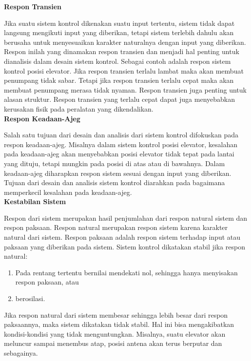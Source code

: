\noindent \textbf{Respon Transien}

Jika suatu sistem kontrol dikenakan suatu input tertentu, sistem tidak dapat langsung mengikuti input yang diberikan, tetapi sistem terlebih dahulu akan berusaha untuk menyesuaikan karakter naturalnya dengan input yang diberikan. Respon inilah yang dinamakan respon transien dan menjadi hal penting untuk dianalisis dalam desain sistem kontrol. Sebagai contoh adalah respon sistem kontrol posisi elevator. Jika respon transien terlalu lambat maka akan membuat penumpang tidak sabar. Tetapi jika respon transien terlalu cepat maka akan membuat penumpang merasa tidak nyaman. Respon transien juga penting untuk alasan struktur. Respon transien yang terlalu cepat dapat juga menyebabkan kerusakan fisik pada peralatan yang dikendalikan.\cite{ControlSystemBook} \\

\noindent \textbf{Respon Keadaan-Ajeg}

Salah satu tujuan dari desain dan analisis dari sistem kontrol difokuskan pada respon keadaan-ajeg. Misalnya dalam sistem kontrol posisi elevator, kesalahan pada keadaan-ajeg akan menyebabkan posisi elevator tidak tepat pada lantai yang dituju, tetapi mungkin pada posisi di atas atau di bawahnya. Dalam keadaan-ajeg diharapkan respon sistem sesuai dengan input yang diberikan. Tujuan dari desain dan analisis sistem kontrol diarahkan pada bagaimana memperkecil kesalahan pada keadaan-ajeg.\cite{ControlSystemBook} \\

\noindent \textbf{Kestabilan Sistem}

Respon dari sistem merupakan hasil penjumlahan dari respon natural sistem dan respon paksaan. Respon natural merupakan respon sistem karena karakter natural dari sistem. Respon paksaan adalah respon sistem terhadap input atau paksaan yang diberikan pada sistem.
Sistem kontrol dikatakan stabil jika respon natural:
\begin{enumerate}
	\item Pada rentang tertentu bernilai mendekati nol, sehingga hanya menyisakan respon paksaan, atau
	\item berosilasi.
\end{enumerate}

Jika respon natural dari sistem membesar sehingga lebih besar dari respon paksaannya, maka sistem dikatakan tidak stabil. Hal ini bisa mengakibatkan kondisi-kondisi yang tidak menguntungkan. Misalnya, suatu elevator akan meluncur sampai menembus atap, posisi antena akan terus berputar dan sebagainya.\\

